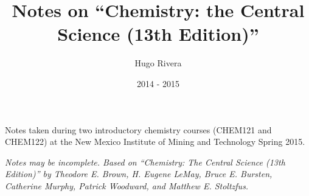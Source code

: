 \documentclass[letterpaper,10pt]{article}
\begin{document}
\title{Notes on ``Chemistry: the Central Science (13th Edition)''}
\author{Hugo Rivera}
\date{2014 - 2015}
\maketitle

Notes taken during two introductory chemistry courses (CHEM121 and CHEM122) at
the New Mexico Institute of Mining and Technology Spring 2015.

\dosecttoc
\setlength{\mtcindent}{5pt}
\begin{multicols}{2}
\tableofcontents
\end{multicols}






















\textit{
Notes may be incomplete. Based on ``Chemistry: The Central Science (13th Edition)''
by
Theodore E. Brown,
H. Eugene LeMay,
Bruce E. Bursten,
Catherine Murphy,
Patrick Woodward, and
Matthew E. Stoltzfus.
}
\end{document}
